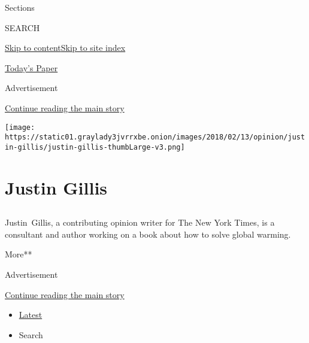 Sections

SEARCH

\protect\hyperlink{site-content}{Skip to
content}\protect\hyperlink{site-index}{Skip to site index}

\href{https://myaccount.nytimes3xbfgragh.onion/auth/login?response_type=cookie\&client_id=vi}{}

\href{https://www.nytimes3xbfgragh.onion/section/todayspaper}{Today's
Paper}

Advertisement

\protect\hyperlink{after-top}{Continue reading the main story}

\texttt{[image: https://static01.graylady3jvrrxbe.onion/images/2018/02/13/opinion/justin-gillis/justin-gillis-thumbLarge-v3.png]}

\hypertarget{justin-gillis}{%
\section{Justin Gillis}\label{justin-gillis}}

\subsection{}

Justin~Gillis, a contributing opinion writer for The New York Times, is
a consultant and author working on a book about how to solve global
warming.

More**

Advertisement

\protect\hyperlink{after-mid1}{Continue reading the main story}

\begin{itemize}
\tightlist
\item
  \protect\hyperlink{stream-panel}{Latest}
\item
  Search
\end{itemize}

